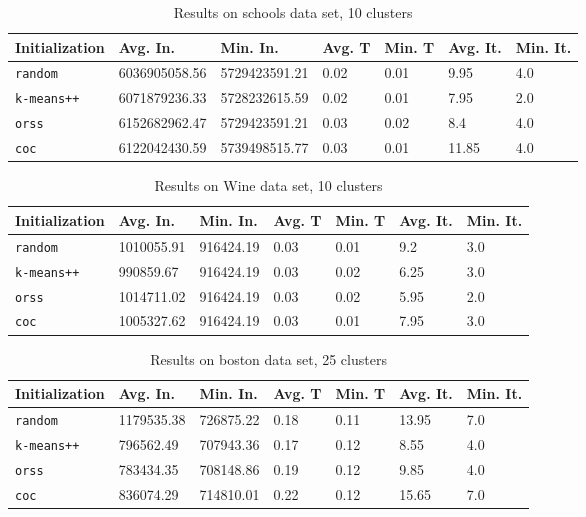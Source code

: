 \documentclass[twoside, 11pt]{article}
\begin{document}
		\begin{table}[p]
			\begin{center}
				\begin{tabular}{|l|l|l|l|l|l|l|}
					\hline
					Initialization & Avg. In. & Min. In. & Avg. T & Min. T & Avg. It. & Min. It.\\\hline
					\texttt{random} & 6036905058.56 & 5729423591.21 & 0.02 & 0.01 & 9.95 & 4.0\\\hline
					\texttt{k-means++} & 6071879236.33 & 5728232615.59 & 0.02 & 0.01 & 7.95 & 2.0\\\hline
					\texttt{orss} & 6152682962.47 & 5729423591.21 & 0.03 & 0.02 & 8.4 & 4.0\\\hline
					\texttt{coc} & 6122042430.59 & 5739498515.77 & 0.03 & 0.01 & 11.85 & 4.0\\\hline
				\end{tabular}
				\caption{Results on schools data set, 10 clusters}
				\label{tbl:schools10}
			\end{center}
		\end{table}
		
		\begin{table}[p]
			\begin{center}
				\begin{tabular}{|l|l|l|l|l|l|l|}
					\hline
					Initialization & Avg. In. & Min. In. & Avg. T & Min. T & Avg. It. & Min. It.\\\hline
					\texttt{random} & 1010055.91 & 916424.19 & 0.03 & 0.01 & 9.2 & 3.0\\\hline
					\texttt{k-means++} & 990859.67 & 916424.19 & 0.03 & 0.02 & 6.25 & 3.0\\\hline
					\texttt{orss} & 1014711.02 & 916424.19 & 0.03 & 0.02 & 5.95 & 2.0\\\hline
					\texttt{coc} & 1005327.62 & 916424.19 & 0.03 & 0.01 & 7.95 & 3.0\\\hline
				\end{tabular}
				\caption{Results on Wine data set, 10 clusters}
				\label{tbl:Wine10}
			\end{center}
		\end{table}
		
		\begin{table}[p]
			\begin{center}
				\begin{tabular}{|l|l|l|l|l|l|l|}
					\hline
					Initialization & Avg. In. & Min. In. & Avg. T & Min. T & Avg. It. & Min. It.\\\hline
					\texttt{random} & 1179535.38 & 726875.22 & 0.18 & 0.11 & 13.95 & 7.0\\\hline
					\texttt{k-means++} & 796562.49 & 707943.36 & 0.17 & 0.12 & 8.55 & 4.0\\\hline
					\texttt{orss} & 783434.35 & 708148.86 & 0.19 & 0.12 & 9.85 & 4.0\\\hline
					\texttt{coc} & 836074.29 & 714810.01 & 0.22 & 0.12 & 15.65 & 7.0\\\hline
				\end{tabular}
				\caption{Results on boston data set, 25 clusters}
				\label{tbl:boston25}
			\end{center}
		\end{table}
		
\end{document}
